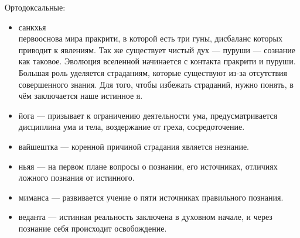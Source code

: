  Ортодоксальные:
 \begin{itemize}
    \itemsep-1ex
    \item санкхья\\
    первооснова мира пракрити, в которой есть три гуны, дисбаланс которых приводит к явлениям. Так же существует чистый дух --- пуруши --- сознание как таковое. Эволюция вселенной начинается с контакта пракрити и пуруши. Большая роль уделяется страданиям, которые существуют из-за отсутствия совершенного знания. Для того, чтобы избежать страданий, нужно понять, в чём заключается наше истинное я.
    \item йога --- призывает к ограничению деятельности ума, предусматривается дисциплина ума и тела, воздержание от греха, сосредоточение.
    \item вайшештка --- коренной причиной страдания является незнание.
    \item ньяя --- на первом плане вопросы о познании, его источниках, отличиях ложного познания от истинного.
    \item миманса --- развивается учение о пяти источниках правильного познания.
    \item веданта --- истинная реальность заключена в духовном начале, и через познание себя происходит освобождение.
\end{itemize}